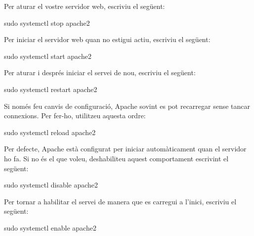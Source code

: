 \documentclass[]{article}
\newenvironment{Shaded}{}{}
\newcommand{\FunctionTok}[1]{\textcolor[rgb]{0.02,0.16,0.49}{#1}}
\newcommand{\NormalTok}[1]{#1}
\begin{document}
Per aturar el vostre servidor web, escriviu el següent:

\begin{Shaded}
\begin{Highlighting}[]
\FunctionTok{sudo}\NormalTok{ systemctl stop apache2}
\end{Highlighting}
\end{Shaded}

Per iniciar el servidor web quan no estigui actiu, escriviu el següent:

\begin{Shaded}
\begin{Highlighting}[]
\FunctionTok{sudo}\NormalTok{ systemctl start apache2}
\end{Highlighting}
\end{Shaded}

Per aturar i després iniciar el servei de nou, escriviu el següent:

\begin{Shaded}
\begin{Highlighting}[]
\FunctionTok{sudo}\NormalTok{ systemctl restart apache2}
\end{Highlighting}
\end{Shaded}

Si només feu canvis de configuració, Apache sovint es pot recarregar
sense tancar connexions. Per fer-ho, utilitzeu aquesta ordre:

\begin{Shaded}
\begin{Highlighting}[]
\FunctionTok{sudo}\NormalTok{ systemctl reload apache2}
\end{Highlighting}
\end{Shaded}

Per defecte, Apache està configurat per iniciar automàticament quan el
servidor ho fa. Si no és el que voleu, deshabiliteu aquest comportament
escrivint el següent:

\begin{Shaded}
\begin{Highlighting}[]
\FunctionTok{sudo}\NormalTok{ systemctl disable apache2}
\end{Highlighting}
\end{Shaded}

Per tornar a habilitar el servei de manera que es carregui a l'inici,
escriviu el següent:

\begin{Shaded}
\begin{Highlighting}[]
\FunctionTok{sudo}\NormalTok{ systemctl enable apache2}
\end{Highlighting}
\end{Shaded}
\end{document}
